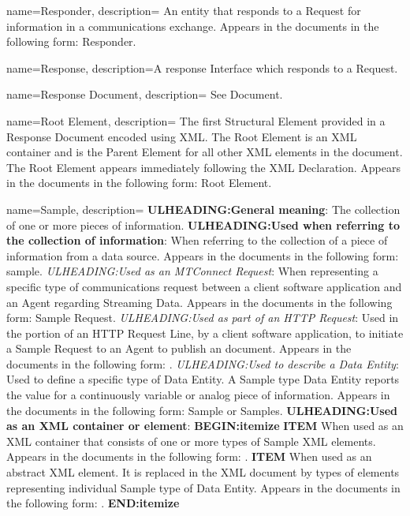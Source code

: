 {
    name={Responder},
	description={
	An entity that responds to a \gls{Request} for information in a communications exchange.
	Appears in the documents in the following form: \gls{Responder}.
}
}

{
    name={Response},
	description={A response \gls{Interface} which responds to a \gls{Request}.}
}

{
    name={Response Document},
	description={
	See \gls{Document}.
}
}

{
    name={Root Element},
	description={
	The first \gls{Structural Element} provided in a \gls{Response Document} encoded using XML.  The \gls{Root Element} is an XML container and is the \gls{Parent Element} for all other XML elements in the document.  The \gls{Root Element} appears immediately following the XML Declaration.
	Appears in the documents in the following form: \gls{Root Element}.
}
}

{
    name={Sample},
	description={
	\textbf{ULHEADING:General meaning}:
	The collection of one or more pieces of information.  
	\textbf{ULHEADING:Used when referring to the collection of information}:
	When referring to the collection of a piece of information from a data source.
	Appears in the documents in the following form: sample.
	\textit{ULHEADING:Used as an \gls{MTConnect Request}}:
	When representing a specific type of communications request between a client software application and an \gls{Agent} regarding \gls{Streaming Data}.  
	Appears in the documents in the following form: \gls{Sample Request}.
	\textit{ULHEADING:Used as part of an \gls{HTTP Request}}:
	Used in the  portion of an \gls{HTTP Request Line}, by a client software application, to initiate a \gls{Sample Request} to an \gls{Agent} to publish an  document.
	Appears in the documents in the following form: .
	\textit{ULHEADING:Used to describe a \gls{Data Entity}}:
	Used to define a specific type of \gls{Data Entity}.  A \gls{Sample} type \gls{Data Entity} reports the value for a continuously variable or analog piece of information.
	Appears in the documents in the following form: \gls{Sample} or \gls{Samples}.
	\textbf{ULHEADING:Used as an XML container or element}:
    \textbf{BEGIN:itemize}
	\textbf{ITEM} When used as an XML container that consists of one or more types of Sample XML elements.
	Appears in the documents in the following form: .
	\textbf{ITEM} When used as an abstract XML element.  It is replaced in the XML document by types of  elements representing individual \gls{Sample} type of \gls{Data Entity}.
	Appears in the documents in the following form: .
    \textbf{END:itemize}
}
}

